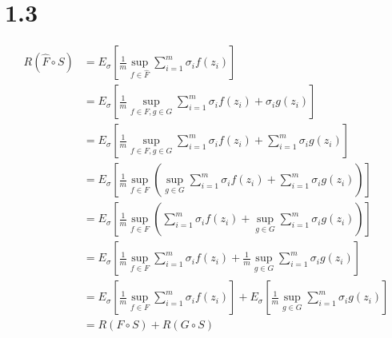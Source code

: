 \documentclass{article}
\begin{document}
\section*{1.3}
\begin{align*}
    R(\hat{F} \circ S) &= E_\sigma \left[ \frac{1}{m}\sup_{f \in \hat{F}}\sum_{i=1}^m \sigma_i f(z_i) \right] \\
    &= E_\sigma \left[ \frac{1}{m}\sup_{f \in F, g \in G} \sum_{i=1}^m \sigma_i f(z_i) + \sigma_i g(z_i) \right] \\
    &= E_\sigma \left[ \frac{1}{m}\sup_{f \in F, g \in G} \sum_{i=1}^m \sigma_i f(z_i) + \sum_{i=1}^m \sigma_i g(z_i) \right] \\
    &= E_\sigma \left[ \frac{1}{m}\sup_{f \in F} \left(\sup_{g \in G} \sum_{i=1}^m \sigma_i f(z_i) + \sum_{i=1}^m \sigma_i g(z_i)\right) \right] \\
    &= E_\sigma \left[ \frac{1}{m}\sup_{f \in F} \left(\sum_{i=1}^m \sigma_i f(z_i) + \sup_{g \in G} \sum_{i=1}^m \sigma_i g(z_i) \right)\right] \\
    &= E_\sigma \left[ \frac{1}{m}\sup_{f \in F} \sum_{i=1}^m \sigma_i f(z_i) + \frac{1}{m}\sup_{g \in G} \sum_{i=1}^m \sigma_i g(z_i) \right] \\
    &= E_\sigma \left[ \frac{1}{m}\sup_{f \in F} \sum_{i=1}^m \sigma_i f(z_i) \right] + E_\sigma \left[ \frac{1}{m}\sup_{g \in G} \sum_{i=1}^m \sigma_i g(z_i) \right] \\
    &= R(F \circ S) + R(G \circ S)
\end{align*}
\end{document}
